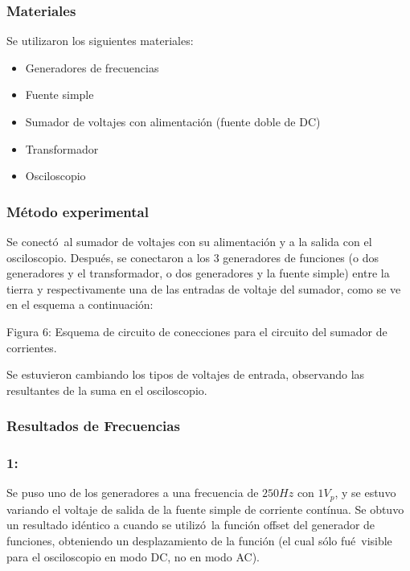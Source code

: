 \documentclass{article}
\begin{document}
\subsubsection{Materiales}
Se utilizaron los siguientes materiales:
\begin{itemize}
\item Generadores de frecuencias
\item Fuente simple
\item Sumador de voltajes con alimentaci\'on (fuente doble de DC)
\item Transformador
\item Osciloscopio
\end{itemize}

\subsubsection{M\'etodo experimental}
Se conect\'o\ al sumador de voltajes con su alimentaci\'on y a la salida con el osciloscopio. Despu\'es, se conectaron a los 3 generadores de funciones (o dos generadores y el transformador, o dos generadores y la fuente simple) entre la tierra y respectivamente una de las entradas de voltaje del sumador, como se ve en el esquema a continuaci\'on:
\vspace{6cm}
\begin{center}
Figura 6: Esquema de circuito de conecciones para el circuito del sumador de corrientes.
\end{center}
Se estuvieron cambiando los tipos de voltajes de entrada, observando las resultantes de la suma en el osciloscopio.

\subsubsection{Resultados de Frecuencias}
\subsubsection*{1:}
Se puso uno de los generadores a una frecuencia de $250Hz$ con $1V_p$, y se estuvo variando el voltaje de salida de la fuente simple de corriente cont\'inua. Se obtuvo un resultado id\'entico a cuando se utiliz\'o\ la funci\'on offset del generador de funciones, obteniendo un desplazamiento de la funci\'on (el cual s\'olo fu\'e\ visible para el osciloscopio en modo DC, no en modo AC).
\end{document}
